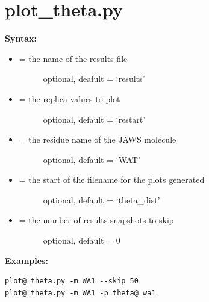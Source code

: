 \documentclass[letterpaper,10pt,english]{manual}
\begin{document}
\section{plot\_theta.py}

\textbf{Syntax:}
\begin{itemize}
\item {} \begin{description}
\item[{ = the name of the results file}] \leavevmode
optional, deafult = `results'

\end{description}

\item {} \begin{description}
\item[{ = the replica values to plot}] \leavevmode
optional, default = `restart'

\end{description}

\item {} \begin{description}
\item[{ = the residue name of the JAWS molecule}] \leavevmode
optional, default = `WAT'

\end{description}

\item {} \begin{description}
\item[{ = the start of the filename for the plots generated}] \leavevmode
optional, default = `theta\_dist'

\end{description}

\item {} \begin{description}
\item[{ = the number of results snapshots to skip}] \leavevmode
optional, default = 0

\end{description}

\end{itemize}

\textbf{Examples:}

\begin{Verbatim}[commandchars=@\[\]]
plot@_theta.py -m WA1 --skip 50
plot@_theta.py -m WA1 -p theta@_wa1
\end{Verbatim}
\end{document}
